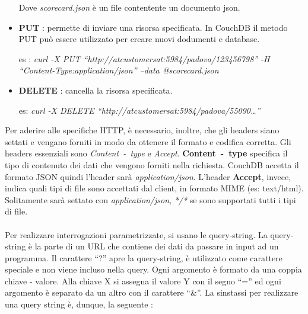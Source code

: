 \begin{itemize}
  Dove \emph{scorecard.json} è un file contentente un documento json. 
  \item \textbf{PUT} : permette di inviare una risorsa specificata. In
  CouchDB il metodo PUT può essere utilizzato per creare nuovi dodumenti e
  database.
  
  es : \emph{curl -X PUT ``http://atcustomersat:5984/padova/123456798''}
  \emph{ -H ``Content-Type:application/json'' --data @scorecard.json}
  \item \textbf{DELETE} : cancella la risorsa specificata.
  
  es: \emph{curl -X DELETE ``http://atcustomersat:5984/padova/55090\ldots''}
\end{itemize}
Per aderire alle specifiche HTTP, è necessario, inoltre, che gli headers
siano settati e vengano forniti in modo da ottenere il formato e codifica
corretta. Gli headers essenziali sono \emph{Content~-~type} e \emph{Accept}.
\textbf{Content~-~type} specifica il tipo di contenuto dei dati che
vengono forniti nella richiesta. CouchDB accetta il formato JSON quindi l'header
sarà \emph{application/json}.
L'header \textbf{Accept}, invece, indica quali tipi di file sono accettati dal
client, in formato MIME (es: text/html). Solitamente sarà settato con
\emph{application/json}, \emph{*/*} se sono supportati tutti i tipi di file.
\\\\
Per realizzare interrogazioni parametrizzate, si usano le query-string. La
query-string è la parte di un URL che contiene dei dati da passare in input ad
un programma. Il carattere ``?'' apre la query-string, è utilizzato come
carattere speciale e non viene incluso nella query. Ogni argomento è formato da
una coppia chiave - valore. Alla chiave X si assegna il valore Y con il segno
``='' ed ogni argomento è separato da un altro con il carattere ``\&''. 
La sinstassi per realizzare una query string è, dunque, la seguente :

